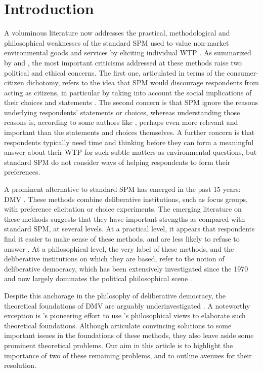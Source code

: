 \documentclass[version=3.21, pagesize, twoside=off, bibliography=totoc, DIV=calc, fontsize=12pt, a4paper, french, english]{scrartcl}
\begin{document}
\section{Introduction}
A voluminous literature now addresses the practical, methodological and philosophical weaknesses of the standard \ac{SPM} used to value non-market environmental goods and services by eliciting individual \ac{WTP} \citep{meinard_ethical_2016}. 
As summarized by \cite{bartkowski_beyond_2018} and \cite{bartkowski_deliberative_2019}, the most important criticisms addressed at these methods raise two political and ethical concerns. 
The first one, articulated in terms of the consumer-citizen dichotomy, refers to the idea that \ac{SPM} would discourage respondents from acting as citizens, in particular by taking into account the social implications of their choices and statements \citep{soma_representing_2014, vatn_institutional_2009}. 
The second concern is that \ac{SPM} ignore the reasons underlying respondents’ statements or choices, whereas understanding those reasons is, according to some authors like \citet{sen_environmental_1995}, perhaps even more relevant and important than the statements and choices themselves. A further concern is that respondents typically need time and thinking before they can form a meaningful answer about their \ac{WTP} for such subtle matters as environmental questions, but standard \ac{SPM} do not consider ways of helping respondents to form their preferences.

A prominent alternative to standard \ac{SPM} has emerged in the past 15 years: \ac{DMV} \citep{spash_deliberative_2007,bartkowski_economic_2017}. 
These methods combine deliberative institutions, such as focus groups, with preference elicitation or choice experiments. 
The emerging literature on these methods suggests that they have important strengths as compared with standard \ac{SPM}, at several levels. 
At a practical level, it appears that respondents find it easier to make sense of these methods, and are less likely to refuse to answer \citep{lienhoop_contingent_2007,szabo_reducing_2011}. 
At a philosophical level, the very label of these methods, and the deliberative institutions on which they are based, refer to the notion of deliberative democracy, which has been extensively investigated since the 1970 and now largely dominates the political philosophical scene \citep{chappell_deliberative_2012}.

Despite this anchorage in the philosophy of deliberative democracy, the theoretical foundations of \ac{DMV} are arguably underinvestigated \citep{bartkowski_economic_2017,bartkowski_beyond_2018,bunse_what_2015,kenter_what_2015}. 
A noteworthy exception is \citet{bartkowski_beyond_2018}’s pioneering effort to use \citet{sen_idea_2009}’s philosophical views to elaborate such theoretical foundations. 
Although \citet{bartkowski_beyond_2018} articulate convincing solutions to some important issues in the foundations of these methods, they also leave aside some prominent theoretical problems. 
Our aim in this article is to highlight the importance of two of these remaining problems, and to outline avenues for their resolution.
\end{document}
